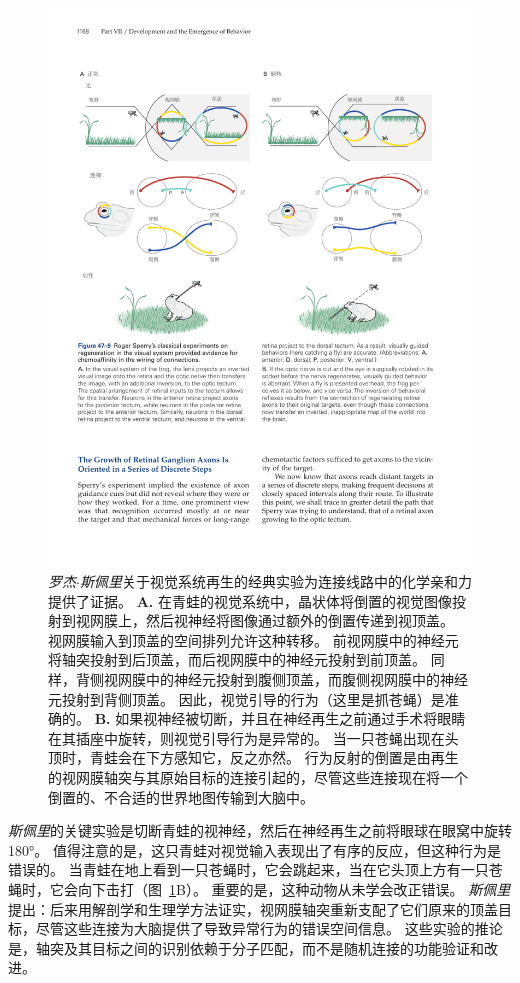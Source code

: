 \begin{figure}[htbp]
	\centering
	\includegraphics[width=0.95\linewidth]{chap47/fig_47_9}
	\caption{\textit{罗杰$\cdot$斯佩里}关于视觉系统再生的经典实验为连接线路中的化学亲和力提供了证据。
		\textbf{A.} 在青蛙的视觉系统中，晶状体将倒置的视觉图像投射到视网膜上，然后视神经将图像通过额外的倒置传递到视顶盖。
		视网膜输入到顶盖的空间排列允许这种转移。
		前视网膜中的神经元将轴突投射到后顶盖，而后视网膜中的神经元投射到前顶盖。
		同样，背侧视网膜中的神经元投射到腹侧顶盖，而腹侧视网膜中的神经元投射到背侧顶盖。
		因此，视觉引导的行为（这里是抓苍蝇）是准确的。
		\textbf{B.} 如果视神经被切断，并且在神经再生之前通过手术将眼睛在其插座中旋转，则视觉引导行为是异常的。
		当一只苍蝇出现在头顶时，青蛙会在下方感知它，反之亦然。
		行为反射的倒置是由再生的视网膜轴突与其原始目标的连接引起的，尽管这些连接现在将一个倒置的、不合适的世界地图传输到大脑中。}
	\label{fig:47_9}
\end{figure}


\textit{斯佩里}的关键实验是切断青蛙的视神经，然后在神经再生之前将眼球在眼窝中旋转 180°。
值得注意的是，这只青蛙对视觉输入表现出了有序的反应，但这种行为是错误的。
当青蛙在地上看到一只苍蝇时，它会跳起来，当在它头顶上方有一只苍蝇时，它会向下击打（图~\ref{fig:47_9}B）。
重要的是，这种动物从未学会改正错误。
\textit{斯佩里}提出：后来用解剖学和生理学方法证实，视网膜轴突重新支配了它们原来的顶盖目标，尽管这些连接为大脑提供了导致异常行为的错误空间信息。
这些实验的推论是，轴突及其目标之间的识别依赖于分子匹配，而不是随机连接的功能验证和改进。



